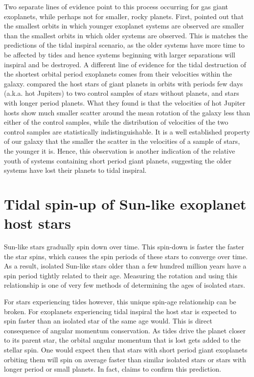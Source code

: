 Two separate lines of evidence point to this process occurring for gas giant
exoplanets, while perhaps not for smaller, rocky planets. First,
\citet{Jackson_et_al_09} pointed out that the smallest orbits in which younger
exoplanet systems are observed are smaller than the smallest orbits in which
older systems are observed. This is matches the predictions of the tidal
inspiral scenario, as the older systems have more time to be affected by tides
and hence systems beginning with larger separations will inspiral and be
destroyed. A different line of evidence for the tidal destruction of the
shortest orbital period exoplanets comes from their velocities within the
galaxy. \citet{Hamer_Schlaufman_19} compared the host stars of giant planets in
orbits with periods few days (a.k.a. hot Jupiters) to two control samples of
stars without planets, and stars with longer period planets. What they found is
that the velocities of hot Jupiter hosts show much smaller scatter around the
mean rotation of the galaxy less than either of the control samples, while the
distribution of velocities of the two control samples are statistically
indistinguishable. It is a well established property of our galaxy that the
smaller the scatter in the velocities of a sample of stars, the younger it is.
Hence, this observation is another indication of the relative youth of systems
containing short period giant planets, suggesting the older systems have lost
their planets to tidal inspiral.

\section{Tidal spin-up of Sun-like exoplanet host stars}

Sun-like stars gradually spin down over time. This spin-down is faster the
faster the star spins, which causes the spin periods of these stars to converge
over time. As a result, isolated Sun-like stars older than a few hundred million
years have a spin period tightly related to their age. Measuring the rotation
and using this relationship is one of very few methods of determining the ages
of isolated stars.

For stars experiencing tides however, this unique spin-age relationship can be
broken. For exoplanets experiencing tidal inspiral the host star is expected to
spin faster than an isolated star of the same age would. This is direct
consequence of angular momentum conservation. As tides drive the planet closer
to its parent star, the orbital angular momentum that is lost gets added to the
stellar spin. One would expect then that stars with short period giant
exoplanets orbiting them will spin on average faster than similar isolated stars
or stars with longer period or small planets. In fact, \citet{Tajeda_et_al_21}
claims to confirm this prediction.

